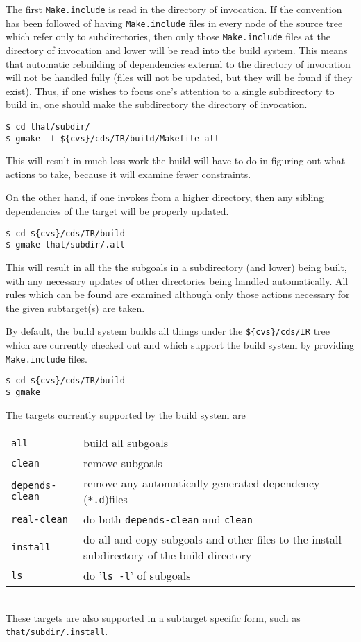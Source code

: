 \documentclass[letterpaper]{article}
\begin{document}
The first \verb+Make.include+ is read in the directory of invocation.
If the convention has been followed of having \verb+Make.include+
files in every node of the source tree which refer only to
subdirectories, then only those \verb+Make.include+ files at the
directory of invocation and lower will be read into the build system.
This means that automatic rebuilding of dependencies external to the
directory of invocation will not be handled fully (files will not be
updated, but they will be found if they exist).  Thus, if one wishes
to focus one's attention to a single subdirectory to build in, one
should make the subdirectory the directory of invocation.
\begin{verbatim}
$ cd that/subdir/
$ gmake -f ${cvs}/cds/IR/build/Makefile all
\end{verbatim}
This will result in much less work the build will have to do in
figuring out what actions to take, because it will examine fewer
constraints.

On the other hand, if one invokes from a higher directory, then
any sibling dependencies of the target will be properly updated.
\begin{verbatim}
$ cd ${cvs}/cds/IR/build
$ gmake that/subdir/.all
\end{verbatim}
This will result in all the the subgoals in a subdirectory (and lower)
being built, with any necessary updates of other directories being
handled automatically.  All rules which can be found are examined
although only those actions necessary for the given subtarget(s) are
taken.

By default, the build system builds all things under the
\verb+${cvs}/cds/IR+ tree which are currently checked out and which
support the build system by providing \verb+Make.include+ files.
\begin{verbatim}
$ cd ${cvs}/cds/IR/build
$ gmake
\end{verbatim}

The targets currently supported by the build system are\\
\begin{tabular}{ll}
\verb+all+ & build all subgoals\\
\verb+clean+ & remove subgoals\\
\verb+depends-clean+ & remove any automatically generated dependency (\verb+*.d+)files\\
\verb+real-clean+ & do both \verb+depends-clean+ and \verb+clean+\\
\verb+install+ & do all and copy subgoals and other files to the install subdirectory of the build directory\\
\verb+ls+ & do '\verb+ls -l+' of subgoals\\
\end{tabular}\\
These targets are also supported in a subtarget specific form, such as
\verb+that/subdir/.install+.
\end{document}
